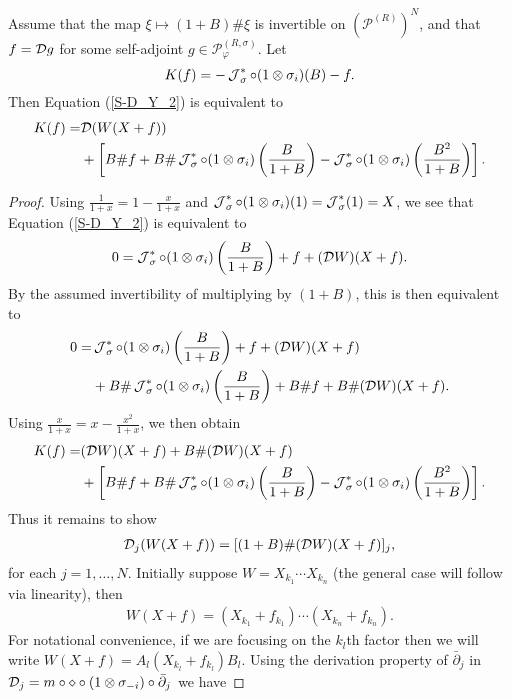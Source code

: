 \begin{lem}\label{K_1}
Assume that the map $\xi\mapsto (1+B)\# \xi$ is invertible on $\left(\mathscr{P}^{(R)}\right)^N$, and that $f=\mathcal D g$ for some self-adjoint $g\in\mathscr{P}_\varphi^{(R,\sigma)}$. Let
	\begin{equation*}
		K(f)=-\operatorname{\mathcal J}_\sigma^*\circ(1\otimes \sigma_i)(B)- f.
	\end{equation*}
Then Equation (\ref{S-D_Y_2}) is equivalent to
	\begin{align*}
		K(f)=&\mathcal D(W(X+f))\\
			&+\left[B\# f+ B\#\operatorname{\mathcal J}_\sigma^*\circ(1\otimes\sigma_i)\left(\frac{B}{1+B}\right) -\operatorname{\mathcal J}_\sigma^*\circ(1\otimes\sigma_i)\left(\frac{B^2}{1+B}\right)\right].
	\end{align*}
\end{lem}
\begin{proof}
Using $\frac{1}{1+x}=1-\frac{x}{1+x}$ and $\operatorname{\mathcal J}_\sigma^*\circ(1\otimes \sigma_i)(1)=\operatorname{\mathcal J}_\sigma^*(1)=X$, we see that Equation (\ref{S-D_Y_2}) is equivalent to
	\begin{align*}
		0=\operatorname{\mathcal J}_\sigma^*\circ(1\otimes\sigma_i)\left(\frac{B}{1+B}\right)+f+(\mathcal D W)(X+f).
	\end{align*}
By the assumed invertibility of multiplying by $(1+B)$, this is then equivalent to
	\begin{align*}
		0=&\operatorname{\mathcal J}_\sigma^*\circ(1\otimes\sigma_i)\left(\frac{B}{1+B}\right)+f+(\mathcal D W)(X+f)\\
			&+B\#\operatorname{\mathcal J}_\sigma^*\circ(1\otimes\sigma_i)\left(\frac{B}{1+B}\right)+B\#f+B\#(\mathcal D W)(X+f).
	\end{align*}
Using $\frac{x}{1+x}=x-\frac{x^2}{1+x}$, we then obtain
	\begin{align*}
		K(f)=&(\mathcal D W)(X+f)+B\#(\mathcal D W)(X+f) \\
			&+\left[B\# f+ B\#\operatorname{\mathcal J}_\sigma^*\circ(1\otimes\sigma_i)\left(\frac{B}{1+B}\right)-\operatorname{\mathcal J}_\sigma^*\circ(1\otimes\sigma_i)\left(\frac{B^2}{1+B}\right)\right].
	\end{align*}
Thus it remains to show
	\begin{align*}
		\mathcal D_j (W(X+f)) = [(1+B)\# (\mathcal D W)(X+f)]_j,
	\end{align*}
for each $j=1,\ldots,N$. Initially suppose $W=X_{k_1}\cdots X_{k_n}$ (the general case will follow via linearity), then
	\begin{align*}
		W(X+f)= (X_{k_1}+f_{k_1})\cdots (X_{k_n}+f_{k_n}).
	\end{align*}
For notational convenience, if we are focusing on the $k_l$th factor then we will write $W(X+f)=A_l(X_{k_l}+f_{k_l})B_l$. Using the derivation property of $\bar{\partial}_j$ in $\mathcal D_j=m\circ\diamond\circ(1\otimes\sigma_{-i})\circ\bar{\partial}_j$ we have

\end{proof}
